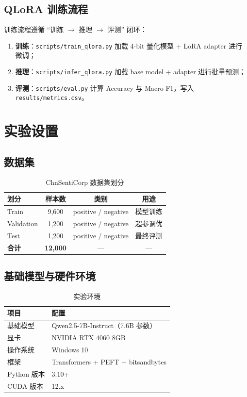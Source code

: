 \documentclass[12pt,a4paper]{article}
\begin{document}
\subsection{QLoRA 训练流程}

训练流程遵循 ``训练 $\rightarrow$ 推理 $\rightarrow$ 评测'' 闭环：
\begin{enumerate}[leftmargin=2em]
  \item \textbf{训练}：\texttt{scripts/train\_qlora.py} 加载 4-bit 量化模型 + LoRA adapter 进行微调；
  \item \textbf{推理}：\texttt{scripts/infer\_qlora.py} 加载 base model + adapter 进行批量预测；
  \item \textbf{评测}：\texttt{scripts/eval.py} 计算 Accuracy 与 Macro-F1，写入 \texttt{results/metrics.csv}。
\end{enumerate}

\section{实验设置}

\subsection{数据集}

\begin{table}[H]
\centering
\caption{ChnSentiCorp 数据集划分}
\label{tab:dataset}
\begin{tabular}{lccc}
\toprule
\textbf{划分} & \textbf{样本数} & \textbf{类别} & \textbf{用途} \\
\midrule
Train & 9,600 & positive / negative & 模型训练 \\
Validation & 1,200 & positive / negative & 超参调优 \\
Test & 1,200 & positive / negative & 最终评测 \\
\midrule
\textbf{合计} & \textbf{12,000} & — & — \\
\bottomrule
\end{tabular}
\end{table}

\subsection{基础模型与硬件环境}

\begin{table}[H]
\centering
\caption{实验环境}
\label{tab:environment}
\begin{tabular}{ll}
\toprule
\textbf{项目} & \textbf{配置} \\
\midrule
基础模型 & Qwen2.5-7B-Instruct（7.6B 参数） \\
显卡 & NVIDIA RTX 4060 8GB \\
操作系统 & Windows 10 \\
框架 & Transformers + PEFT + bitsandbytes \\
Python 版本 & 3.10+ \\
CUDA 版本 & 12.x \\
\bottomrule
\end{tabular}
\end{table}
\end{document}
